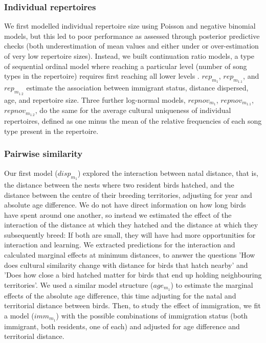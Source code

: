 \documentclass[9pt, onecolumn, twoside, lineno]{gsajnl}
\begin{document}
\subsubsection{Individual repertoires}
We first modelled individual repertoire size using Poisson and negative binomial models, but this led to poor performance as assessed through posterior predictive checks (both underestimation of mean values and either under or over-estimation of very low repertoire sizes). Instead, we built continuation ratio models, a type of sequential ordinal model where reaching a particular level (number of song types in the repertoire) requires first reaching all lower levels \autocite{chambers2023, warti2020}. $rep_{m_1}$, $rep_{m_{1.1}}$, and $rep_{m_{1.2}}$ estimate the association between immigrant status, distance dispersed, age, and repertoire size. Three further log-normal models, $repnov_{m_1}$, $repnov_{m_{1.1}}$, $repnov_{m_{1.2}}$, do the same for the average cultural uniqueness of individual repertoires, defined as one minus the mean of the relative frequencies of each song type present in the repertoire.

\subsubsection{Pairwise similarity}
Our first model ($disp_{m_1}$) explored the interaction between natal distance, that is, the distance between the nests where two resident birds hatched, and the distance between the centre of their breeding territories, adjusting for year and absolute age difference. We do not have direct information on how long birds have spent around one another, so instead we estimated the effect of the interaction of the distance at which they hatched and the distance at which they subsequently breed: If both are small, they will have had more opportunities for interaction and learning. We extracted predictions for the interaction and calculated marginal effects at minimum distances, to answer the questions 'How does cultural similarity change with distance for birds that hatch nearby' and 'Does how close a bird hatched matter for birds that end up holding neighbouring territories'. We used a similar model structure ($age_{m_1}$) to estimate the marginal effects of the absolute age difference, this time adjusting for the natal and territorial distance between birds. Then, to study the effect of immigration, we fit a model ($imm_{m_1}$) with the possible combinations of immigration status (both immigrant, both residents, one of each) and adjusted for age difference and territorial distance. 
\end{document}
